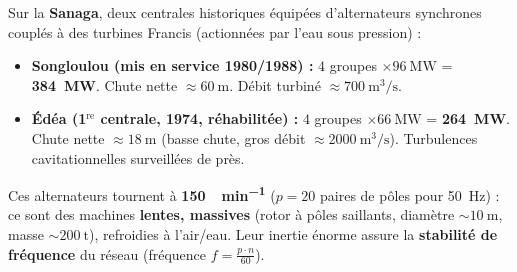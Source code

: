 \documentclass[11pt]{article}
\begin{document}
\begin{exemplebox}
Sur la \textbf{Sanaga}, deux centrales historiques équipées d'alternateurs synchrones couplés à des turbines Francis (actionnées par l'eau sous pression) :
\begin{itemize}
    \item \textbf{Songloulou (mis en service 1980/1988) :} $4$ groupes $\times \SI{96}{\mega\watt}$ = \textbf{\SI{384}{\mega\watt}}. Chute nette $\approx \SI{60}{\meter}$. Débit turbiné $\approx \SI{700}{\meter^3\per\second}$.
    \item \textbf{Édéa (1$^{\text{re}}$ centrale, 1974, réhabilitée) :} $4$ groupes $\times \SI{66}{\mega\watt}$ = \textbf{\SI{264}{\mega\watt}}. Chute nette $\approx \SI{18}{\meter}$ (basse chute, gros débit $\approx \SI{2000}{\meter^3\per\second}$). Turbulences cavitationnelles surveillées de près.
\end{itemize}
Ces alternateurs tournent à \textbf{\SI{150}{\tr\per\minute}} ($p=20$ paires de pôles pour \SI{50}{\hertz}) : ce sont des machines \textbf{lentes, massives} (rotor à pôles saillants, diamètre $\sim \SI{10}{\meter}$, masse $\sim \SI{200}{\tonne}$), refroidies à l'air/eau. Leur inertie énorme assure la \textbf{stabilité de fréquence} du réseau (fréquence $f = \frac{p \cdot n}{60}$).
\end{exemplebox}
\end{document}
